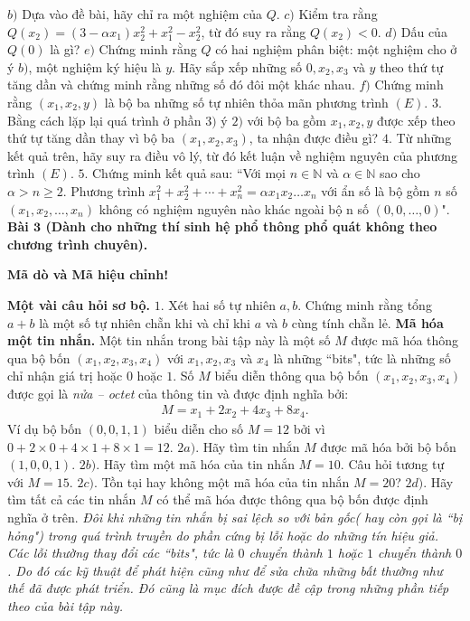\begin{multicols}{2}
	\vskip 0.1cm
	$b)$ Dựa vào đề bài, hãy chỉ ra một nghiệm của $Q$.
	\vskip 0.1cm
	$c)$ Kiểm tra rằng $Q(x_2 )=(3- \alpha x_1 )x_2^2+x_1^2-x_2^2$, từ đó suy ra rằng $Q(x_2 )<0$.
	\vskip 0.1cm 
	$d)$ Dấu của $Q(0)$ là gì?
	\vskip 0.1cm 
	$e)$ Chứng minh rằng $Q$ có hai nghiệm phân biệt: một nghiệm cho ở ý $b)$, một nghiệm ký hiệu là $y$. Hãy sắp xếp những số $0,x_2,x_3$ và $y$ theo thứ tự tăng dần và chứng minh rằng những số đó đôi một khác nhau. 
	\vskip 0.1cm
	$f)$ Chứng minh rằng $(x_1,x_2,y)$ là bộ ba những số tự nhiên thỏa mãn phương trình $(E)$.
	\vskip 0.1cm 
	$3.$ Bằng cách lặp lại quá trình ở phần $3)$ ý $2)$ với bộ ba gồm $x_1,x_2,y$ được xếp theo thứ tự tăng dần thay vì bộ ba $(x_1,x_2,x_3)$, ta nhận được điều gì?
	\vskip 0.1cm
	$4.$ Từ những kết quả trên, hãy suy ra điều vô lý, từ đó kết luận về nghiệm nguyên của phương trình $(E)$.
	\vskip 0.1cm
	$5.$ Chứng minh kết quả sau: ``Với mọi $n \in \mathbb{N}$ và  $\alpha \in \mathbb{N}$ sao cho  $\alpha>n\ge2$. Phương trình $x_1^2+x_2^2+⋯+x_n^2= \alpha x_1 x_2\ldots x_n$  với ẩn số là bộ gồm $n$ số $(x_1,x_2,\ldots,x_n)$ không có nghiệm nguyên nào khác ngoài bộ n số $(0,0,\ldots,0)$". 
	\vskip 0.1cm
	 \textbf{\color{cackithi}Bài $\pmb{3}$ (Dành cho những thí sinh hệ phổ thông phổ quát không theo chương trình chuyên).} 
	\vskip 0.1cm
	\centerline{ \textbf{\color{cackithi}Mã dò và Mã hiệu chỉnh!}}
	\vskip 0.1cm 
	 \textbf{\color{cackithi}Một vài câu hỏi sơ bộ.}
	\vskip 0.1cm
	$1.$ Xét hai số tự nhiên $a,b$. Chứng minh rằng tổng $a+b$ là một số tự nhiên chẵn khi và chỉ khi $a$ và $b$ cùng tính chẵn lẻ. 
	\vskip 0.1cm
	 \textbf{\color{cackithi}Mã hóa một tin nhắn.}
	\vskip 0.1cm
	Một tin nhắn trong bài tập này là một số $M$ được mã hóa thông qua bộ bốn $(x_1,x_2,x_3,x_4)$ với $x_1,x_2,x_3 $ và $ x_4$ là những ``bits", tức là những số chỉ nhận giá trị hoặc $0$ hoặc $1$. Số $M$ biểu diễn thông qua bộ bốn $(x_1,x_2,x_3,x_4)$ được gọi là \textit{nửa -- octet} của thông tin và được định nghĩa bởi: 
	\begin{align*}
		M=x_1+2x_2+4x_3+8x_4.
	\end{align*}
	Ví dụ bộ bốn $(0,0,1,1)$ biểu diễn cho số $M=12$ bởi vì $0+2 \times 0+4×1+8 \times 1=12$. 
	\vskip 0.1cm
	$2a)$. Hãy tìm tin nhắn $M$ được mã hóa bởi bộ bốn $(1,0,0,1)$.
	\vskip 0.1cm
	$2b)$. Hãy tìm một mã hóa của tin nhắn $M=10$. Câu hỏi tương tự với $M=15$.
	\vskip 0.1cm
	$2c)$. Tồn tại hay không một mã hóa của tin nhắn $M=20$? 
	\vskip 0.1cm
	$2d)$. Hãy tìm tất cả các tin nhắn $M$ có thể mã hóa được thông qua bộ bốn được định nghĩa ở trên. 
	\vskip 0.1cm
	\textit{Đôi khi những tin nhắn bị sai lệch so với bản gốc( hay còn gọi là ``bị hỏng") trong quá trình truyền do phần cứng bị lỗi hoặc do những tín hiệu giả. Các lỗi thường thay đổi các ``bits", tức là $0$ chuyển thành $1$ hoặc $1$ chuyển thành $0$. Do đó các kỹ thuật để phát hiện cũng như để sửa chữa những bất thường như thế đã được phát triển. Đó cũng là mục đích được đề cập trong những phần tiếp theo của bài tập này.}

\end{multicols}
